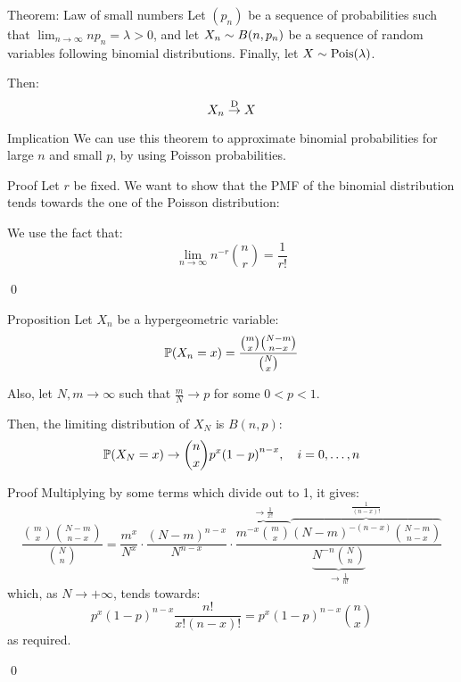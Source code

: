\documentclass[a4paper]{article}
\begin{document}
\begin{parag}{Theorem: Law of small numbers}
    Let $\left(p_n\right)$ be a sequence of probabilities such that $\lim_{n \to \infty} n p_n = \lambda > 0$, and let $X_n \followsdistr B\left(n, p_n\right)$ be a sequence of random variables following binomial distributions. Finally, let $X \followsdistr \text{Pois}\left(\lambda\right)$.

    Then:
    \[X_n \over{\to}{D} X\]

    \begin{subparag}{Implication}
        We can use this theorem to approximate binomial probabilities for large $n$ and small $p$, by using Poisson probabilities.
    \end{subparag}
    
    
    \begin{subparag}{Proof}
        Let $r$ be fixed. We want to show that the PMF of the binomial distribution tends towards the one of the Poisson distribution:
        
        We use the fact that: 
        \[\lim_{n \to \infty} n^{-r} \binom{n}{r} = \frac{1}{r!}\]

        \qed
    \end{subparag}
\end{parag}

\begin{parag}{Proposition}
    Let $X_n$ be a hypergeometric variable: 
    \[\prob\left(X_n = x\right) = \frac{\binom{m}{x} \binom{N-m}{n-x}}{\binom{N}{x}}\]
    
    Also, let $N, m \to \infty$ such that $\frac{m}{N} \to p$ for some $0 < p < 1$. 

    Then, the limiting distribution of $X_N$ is $B\left(n, p\right)$: 
    \[\prob\left(X_N = x\right) \to \binom{n}{x} p^x \left(1-p\right)^{n-x}, \mathspace i = 0, \ldots, n\]
     
    \begin{subparag}{Proof}
        Multiplying by some terms which divide out to 1, it gives: 
        \[\frac{\binom{m}{x} \binom{N-m}{n-x}}{\binom{N}{n}} = \frac{m^x}{N^x}\cdot \frac{\left(N - m\right)^{n-x}}{N^{n-x}} \cdot  \frac{\overbrace{m^{-x} \binom{m}{x}}^{\to \frac{1}{x!}}\overbrace{\left(N - m\right)^{-\left(n-x\right)}\binom{N-m}{n-x}}^{\frac{1}{\left(n-x\right)!}}}{\underbrace{N^{-n} \binom{N}{n}}_{\to \frac{1}{n!}}}\]
        which, as $N \to +\infty$, tends towards:
        \[p^{x} \left(1-p\right)^{n-x} \frac{n!}{x! \left(n-x\right)!} = p^x \left(1-p\right)^{n-x} \binom{n}{x}\]
        as required.

        \qed
    \end{subparag}
\end{parag}
\end{document}
